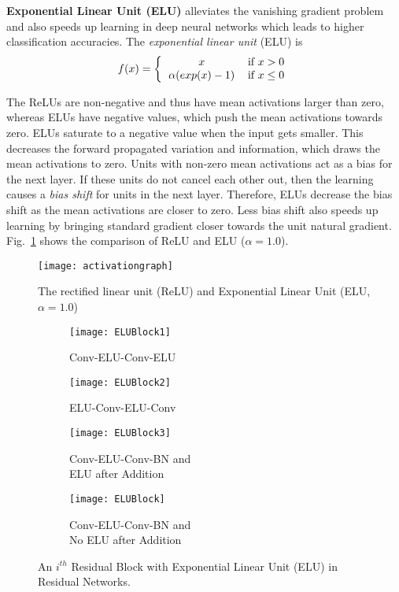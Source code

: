 \documentclass[10pt,twocolumn,letterpaper]{article}
\begin{document}
\textbf{Exponential Linear Unit (ELU)} \cite{[9]} alleviates the vanishing gradient problem and also speeds up learning in deep neural networks which leads to higher classification accuracies. The \emph{exponential linear unit} (ELU) is
\[ f(x) = \bigg \{ \begin{tabular}{cc}
$x$ & if $x > 0$ \\
$\alpha (exp(x)-1)$ & if $x \leq 0$
\end{tabular} \]


The ReLUs are non-negative and thus have mean activations larger than zero, whereas ELUs have negative values, which push the mean activations towards zero. ELUs saturate to a negative value when the input gets smaller. This decreases the forward propagated variation and information, which draws the mean activations to zero. Units with non-zero mean activations act as a bias for the next layer. If these units do not cancel each other out, then the learning causes a \emph{bias shift} for units in the next layer. Therefore, ELUs decrease the bias shift as the mean activations are closer to zero. Less bias shift also speeds up learning by bringing standard gradient closer towards the unit natural gradient. Fig.~\ref{fig:elu} shows the comparison of ReLU and ELU ($\alpha=1.0$).

\begin{figure}
\centering
\texttt{[image: activationgraph]}
\caption{The rectified linear unit (ReLU) and Exponential Linear Unit (ELU, $\alpha = 1.0$)}
\label{fig:elu}
\end{figure}




\begin{figure*}
    \centering
    \begin{subfigure}{.24\linewidth}
        \centering
        \texttt{[image: ELUBlock1]}
        \caption{Conv-ELU-Conv-ELU}
        \label{fig:Conv-ELU-Conv-ELU}
    \end{subfigure}
    \begin{subfigure}{.24\linewidth}
        \centering
        \texttt{[image: ELUBlock2]}
        \caption{ELU-Conv-ELU-Conv}
        \label{fig:ELU-Conv-ELU-Conv}
    \end{subfigure}
    \begin{subfigure}{.24\linewidth}
        \centering
        \texttt{[image: ELUBlock3]}
        \caption{Conv-ELU-Conv-BN and \\ ELU after Addition}
        \label{fig:Conv-ELU-Conv-BN1}
    \end{subfigure}
    \begin{subfigure}{.24\linewidth}
        \centering
        \texttt{[image: ELUBlock]}
        \caption{Conv-ELU-Conv-BN and \\ No ELU after Addition}
        \label{fig:Conv-ELU-Conv-BN2}
    \end{subfigure}
    \caption{An \(i^{th}\) Residual Block with Exponential Linear Unit (ELU) in Residual Networks.}
    \label{fig:ELUBlocks}
\end{figure*}
\end{document}
